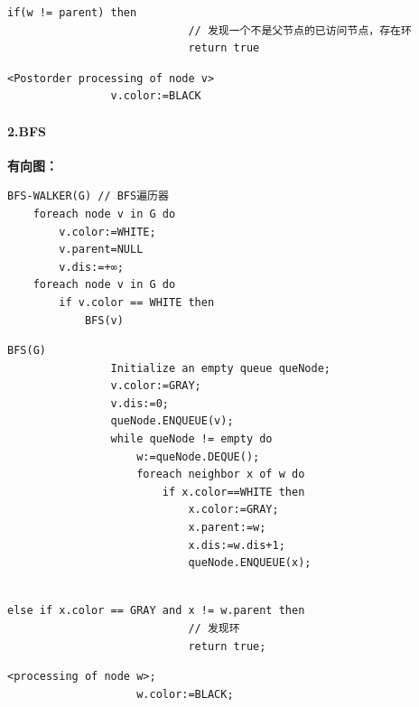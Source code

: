 \documentclass{article}
\begin{document}
\begin{lstlisting}[style=algorithm]
                        if(w != parent) then
                            // 发现一个不是父节点的已访问节点，存在环
                            return true
                    \end{lstlisting}

\begin{lstlisting}[style=algorithmPPT]
                <Postorder processing of node v>
                v.color:=BLACK
            \end{lstlisting}

\pagebreak

\paragraph{2.BFS\\}
\textbf{有向图：\\}
\begin{lstlisting}[style=algorithmPPT]
    BFS-WALKER(G) // BFS遍历器
    foreach node v in G do
        v.color:=WHITE; 
        v.parent=NULL 
        v.dis:=+∞;
    foreach node v in G do
        if v.color == WHITE then
            BFS(v)
        \end{lstlisting}

\begin{lstlisting}[style=algorithmPPT]
            BFS(G)
                Initialize an empty queue queNode;
                v.color:=GRAY;
                v.dis:=0;
                queNode.ENQUEUE(v);
                while queNode != empty do
                    w:=queNode.DEQUE();
                    foreach neighbor x of w do
                        if x.color==WHITE then
                            x.color:=GRAY;
                            x.parent:=w;
                            x.dis:=w.dis+1;
                            queNode.ENQUEUE(x);
                        
                    \end{lstlisting}
\begin{lstlisting}[style=algorithm]
                        else if x.color == GRAY and x != w.parent then
                            // 发现环
                            return true;
                        \end{lstlisting}
\begin{lstlisting}[style=algorithmPPT]
                    <processing of node w>;
                    w.color:=BLACK;
\end{lstlisting}
\end{document}

